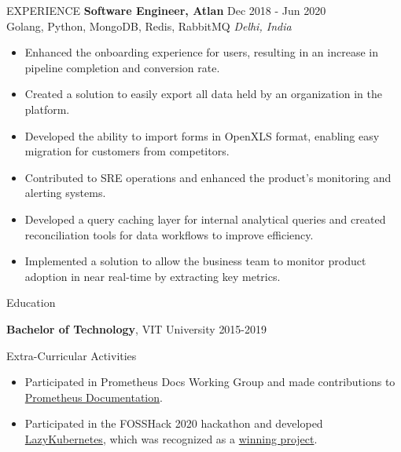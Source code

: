 \documentclass{resume} %
\begin{document}
\begin{rSection}{EXPERIENCE}
\textbf{Software Engineer, Atlan} \hfill Dec 2018 - Jun 2020\\
Golang, Python, MongoDB, Redis, RabbitMQ \hfill \textit{Delhi, India} \begin{itemize}
    \itemsep -3pt {} 
\item Enhanced the onboarding experience for users, resulting in an increase in pipeline completion and conversion rate.
\item Created a solution to easily export all data held by an organization in the platform.
\item Developed the ability to import forms in OpenXLS format, enabling easy migration for customers from competitors.
\item Contributed to SRE operations and enhanced the product's monitoring and alerting systems.
\item Developed a query caching layer for internal analytical queries and created reconciliation tools for data workflows to improve efficiency.
\item Implemented a solution to allow the business team to monitor product adoption in near real-time by extracting key metrics.
 \end{itemize}
\end{rSection} 


\begin{rSection}{Education}

{\bf Bachelor of Technology}, VIT University \hfill {2015-2019}\\
\end{rSection}


\begin{rSection}{Extra-Curricular Activities} 
\begin{itemize}
    \item 	Participated in Prometheus Docs Working Group and made contributions to \href{https://github.com/prometheus/docs/commits?author=yolossn}{Prometheus Documentation}.
    \item  Participated in the FOSSHack 2020 hackathon and developed \href{https://github.com/yolossn/lazykubernetes}{LazyKubernetes}, which was recognized as a \href{https://forum.fossunited.org/t/foss-hack-2020-results/424}{winning project}. 
\end{itemize}
\end{rSection}
\end{document}
